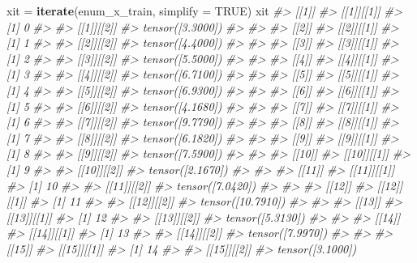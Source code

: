 \documentclass[]{book}
\newenvironment{Shaded}{\begin{snugshade}}{\end{snugshade}}
\newcommand{\CommentTok}[1]{\textcolor[rgb]{0.56,0.35,0.01}{\textit{#1}}}
\newcommand{\DataTypeTok}[1]{\textcolor[rgb]{0.13,0.29,0.53}{#1}}
\newcommand{\KeywordTok}[1]{\textcolor[rgb]{0.13,0.29,0.53}{\textbf{#1}}}
\newcommand{\NormalTok}[1]{#1}
\newcommand{\OtherTok}[1]{\textcolor[rgb]{0.56,0.35,0.01}{#1}}
\newcommand{\StringTok}[1]{\textcolor[rgb]{0.31,0.60,0.02}{#1}}
\begin{document}
\begin{Shaded}
\begin{Highlighting}[]
\NormalTok{xit =}\StringTok{ }\KeywordTok{iterate}\NormalTok{(enum_x_train, }\DataTypeTok{simplify =} \OtherTok{TRUE}\NormalTok{)}
\NormalTok{xit}
\CommentTok{#> [[1]]}
\CommentTok{#> [[1]][[1]]}
\CommentTok{#> [1] 0}
\CommentTok{#> }
\CommentTok{#> [[1]][[2]]}
\CommentTok{#> tensor([3.3000])}
\CommentTok{#> }
\CommentTok{#> }
\CommentTok{#> [[2]]}
\CommentTok{#> [[2]][[1]]}
\CommentTok{#> [1] 1}
\CommentTok{#> }
\CommentTok{#> [[2]][[2]]}
\CommentTok{#> tensor([4.4000])}
\CommentTok{#> }
\CommentTok{#> }
\CommentTok{#> [[3]]}
\CommentTok{#> [[3]][[1]]}
\CommentTok{#> [1] 2}
\CommentTok{#> }
\CommentTok{#> [[3]][[2]]}
\CommentTok{#> tensor([5.5000])}
\CommentTok{#> }
\CommentTok{#> }
\CommentTok{#> [[4]]}
\CommentTok{#> [[4]][[1]]}
\CommentTok{#> [1] 3}
\CommentTok{#> }
\CommentTok{#> [[4]][[2]]}
\CommentTok{#> tensor([6.7100])}
\CommentTok{#> }
\CommentTok{#> }
\CommentTok{#> [[5]]}
\CommentTok{#> [[5]][[1]]}
\CommentTok{#> [1] 4}
\CommentTok{#> }
\CommentTok{#> [[5]][[2]]}
\CommentTok{#> tensor([6.9300])}
\CommentTok{#> }
\CommentTok{#> }
\CommentTok{#> [[6]]}
\CommentTok{#> [[6]][[1]]}
\CommentTok{#> [1] 5}
\CommentTok{#> }
\CommentTok{#> [[6]][[2]]}
\CommentTok{#> tensor([4.1680])}
\CommentTok{#> }
\CommentTok{#> }
\CommentTok{#> [[7]]}
\CommentTok{#> [[7]][[1]]}
\CommentTok{#> [1] 6}
\CommentTok{#> }
\CommentTok{#> [[7]][[2]]}
\CommentTok{#> tensor([9.7790])}
\CommentTok{#> }
\CommentTok{#> }
\CommentTok{#> [[8]]}
\CommentTok{#> [[8]][[1]]}
\CommentTok{#> [1] 7}
\CommentTok{#> }
\CommentTok{#> [[8]][[2]]}
\CommentTok{#> tensor([6.1820])}
\CommentTok{#> }
\CommentTok{#> }
\CommentTok{#> [[9]]}
\CommentTok{#> [[9]][[1]]}
\CommentTok{#> [1] 8}
\CommentTok{#> }
\CommentTok{#> [[9]][[2]]}
\CommentTok{#> tensor([7.5900])}
\CommentTok{#> }
\CommentTok{#> }
\CommentTok{#> [[10]]}
\CommentTok{#> [[10]][[1]]}
\CommentTok{#> [1] 9}
\CommentTok{#> }
\CommentTok{#> [[10]][[2]]}
\CommentTok{#> tensor([2.1670])}
\CommentTok{#> }
\CommentTok{#> }
\CommentTok{#> [[11]]}
\CommentTok{#> [[11]][[1]]}
\CommentTok{#> [1] 10}
\CommentTok{#> }
\CommentTok{#> [[11]][[2]]}
\CommentTok{#> tensor([7.0420])}
\CommentTok{#> }
\CommentTok{#> }
\CommentTok{#> [[12]]}
\CommentTok{#> [[12]][[1]]}
\CommentTok{#> [1] 11}
\CommentTok{#> }
\CommentTok{#> [[12]][[2]]}
\CommentTok{#> tensor([10.7910])}
\CommentTok{#> }
\CommentTok{#> }
\CommentTok{#> [[13]]}
\CommentTok{#> [[13]][[1]]}
\CommentTok{#> [1] 12}
\CommentTok{#> }
\CommentTok{#> [[13]][[2]]}
\CommentTok{#> tensor([5.3130])}
\CommentTok{#> }
\CommentTok{#> }
\CommentTok{#> [[14]]}
\CommentTok{#> [[14]][[1]]}
\CommentTok{#> [1] 13}
\CommentTok{#> }
\CommentTok{#> [[14]][[2]]}
\CommentTok{#> tensor([7.9970])}
\CommentTok{#> }
\CommentTok{#> }
\CommentTok{#> [[15]]}
\CommentTok{#> [[15]][[1]]}
\CommentTok{#> [1] 14}
\CommentTok{#> }
\CommentTok{#> [[15]][[2]]}
\CommentTok{#> tensor([3.1000])}
\end{Highlighting}
\end{Shaded}
\end{document}
